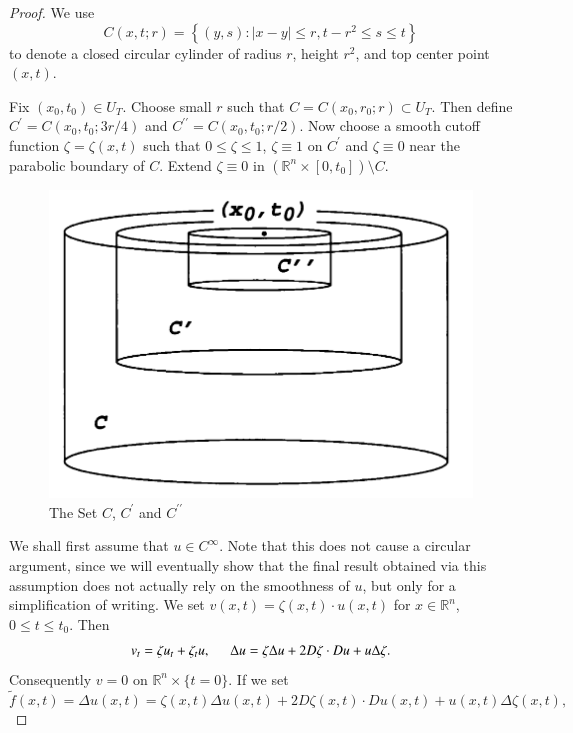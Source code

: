 \begin{proof}
We use 
$$
C\left( x,t;r \right) =\left\{ \left( y,s \right) :\left| x-y \right|\le r,t-r^2\le s\le t \right\} 
$$
to denote a closed circular cylinder of radius $r$, height $r^2$, and top center point $(x,t)$.\par
Fix $(x_0,t_0)\in U_T$. Choose small $r$ such that $C=C(x_0,r_0;r)\subset U_T$. Then define $C^\prime=C(x_0,t_0;3r/4)$ and $C^{\prime\prime}=C(x_0,t_0;r/2)$. Now choose a smooth cutoff function $\zeta=\zeta(x,t)$ such that $0\le\zeta\le 1$, $\zeta\equiv 1$ on $C^\prime$ and $\zeta\equiv 0$ near the parabolic boundary of $C$. Extend $\zeta\equiv 0$ in $(\mathbb{R}^n\times[0,t_0])\setminus C$.\par
\begin{figure}[htbp]
    \center
    \includegraphics[scale=0.24]{Image/Circle Cylinders.png}
    \caption{The Set $C$, $C^\prime$ and $C^{\prime\prime}$}
\end{figure}
We shall first assume that $u\in C^\infty$. Note that this does not cause a circular argument, since we will eventually show that the final result obtained via this assumption does not actually rely on the smoothness of $u$, but only for a simplification of writing. We set $v(x,t)=\zeta(x,t)\cdot u(x,t)$ for $x\in\mathbb{R}^n$, $0\le t\le t_0$. Then 
$$
v_t=\zeta u_t+\zeta _tu,\hspace{0.5cm}\Delta u=\zeta \Delta u+2D\zeta \cdot Du+u\Delta \zeta .
$$
Consequently $v=0$ on $\mathbb{R}^n\times\{t=0\}$. If we set 
$$
\widetilde{f}\left( x,t \right) =\Delta u\left( x,t \right) =\zeta \left( x,t \right) \Delta u\left( x,t \right) +2D\zeta \left( x,t \right) \cdot Du\left( x,t \right) +u\left( x,t \right) \Delta \zeta \left( x,t \right) ,
$$
\end{proof}
